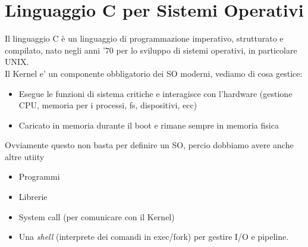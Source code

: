 \documentclass[a4paper,12pt]{article}
\begin{document}
\pagebreak
\section{Linguaggio C per Sistemi Operativi}
Il linguaggio C è un linguaggio di programmazione imperativo, strutturato e compilato, nato negli anni '70 per lo sviluppo di sistemi operativi, in particolare UNIX. \\
Il Kernel e' un componente obbligatorio dei SO moderni, vediamo di cosa gestice:
\begin{itemize}
  \item Esegue le funzioni di sistema critiche e interagisce con l’hardware (gestione CPU, memoria per i processi, fs, dispositivi, ecc)
  \item Caricato in memoria durante il boot e rimane sempre in memoria fisica
\end{itemize}
Ovviamente questo non basta per definire un SO, percio dobbiamo avere anche altre utiity
\begin{itemize}
  \item Programmi
  \item Librerie
  \item System call (per comunicare con il Kernel)
  \item Una \textit{shell} (interprete dei comandi in exec/fork) per gestire I/O e pipeline.
\end{itemize}
\end{document}

